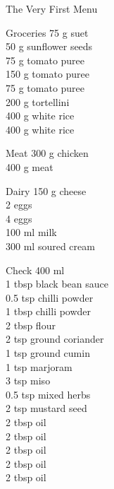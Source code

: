 \begin{menu}{The Very First Menu}
\begin{shoppinglist}{Groceries}
      75 g suet \\ 
      50 g sunflower seeds \\ 
      75 g tomato puree \\ 
      150 g tomato puree \\ 
      75 g tomato puree \\ 
      200 g tortellini \\ 
      400 g white rice \\ 
      400 g white rice \\ 
      \end{shoppinglist}%
      \par\vfil %
      \begin{shoppinglist}{Meat}
      300 g chicken \\ 
      400 g meat \\ 
      \end{shoppinglist}%
      \begin{shoppinglist}{Dairy}
      150 g cheese \\ 
      2  eggs \\ 
      4  eggs \\ 
      100 ml milk \\ 
      300 ml soured cream \\ 
      \end{shoppinglist}%
      \par\vfil %
      \vfil\clearpage %
      \begin{shoppinglist}{Check}
      400 ml  \\ 
      1 tbsp black bean sauce \\ 
      0.5 tsp chilli powder \\ 
      1 tbsp chilli powder \\ 
      2 tbsp flour \\ 
      2 tsp ground coriander \\ 
      1 tsp ground cumin \\ 
      1 tsp marjoram \\ 
      3 tsp miso \\ 
      0.5 tsp mixed herbs \\ 
      2 tsp mustard seed \\ 
      2 tbsp oil \\ 
      2 tbsp oil \\ 
      2 tbsp oil \\ 
      2 tbsp oil \\ 
      2 tbsp oil \\ 

\end{shoppinglist}
\end{menu}
